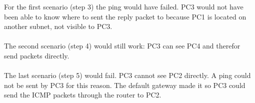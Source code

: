 For the first scenario (step 3) the ping would have failed. PC3 would not have been able to know where to sent the reply packet to because PC1 is located on another subnet, not visible to PC3. \\ \\
The second scenario (step 4) would still work: PC3 can see PC4 and therefor send packets directly. \\ \\
The last scenario (step 5) would fail. PC3 cannot see PC2 directly. A ping could not be sent by PC3 for this reason. The default gateway made it so PC3 could send the ICMP packets through the router to PC2.